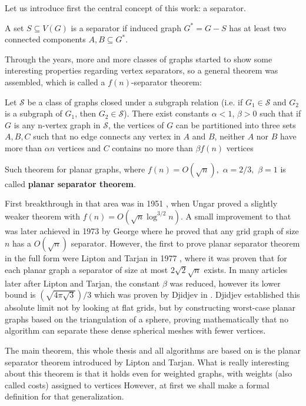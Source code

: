 Let us introduce first the central concept of this work: a separator.
\begin{defn}
    A set $S \subseteq V(G)$ is a separator if induced graph $G^* = G - S$
    has at least two connected components $A,B \subseteq G^*$.
\end{defn}

Through the years, more and more classes of graphs started to show some
interesting properties regarding vertex separators, so a general theorem was
assembled, which is called a $f(n)$-separator theorem:
\begin{theorem} \cite{liptonSeparatorTheoremPlanar1979}  \label{thm:fnseparator}
    Let $\mathcal{S}$ be a class of graphs closed under a subgraph relation (i.e. if
    $G_1 \in \mathcal{S}$ and $G_2$ is a subgraph of $G_1$, then $G_2 \in \mathcal{S}$). There
    exist constants $\alpha < 1$, $\beta > 0$ such that if $G$ is any n-vertex
    graph in $\mathcal{S}$, the vertices of $G$ can be partitioned into three sets $A,B,C$
    such that no edge connects any vertex in $A$ and $B$, neither $A$ nor $B$
    have more than $\alpha n$ vertices and $C$ contains no more than $\beta
    f(n)$ vertices
\end{theorem}

Such theorem for planar graphs, where $f(n) = O(\sqrt{n}),$ $ \alpha = 2/3,
$ $\beta = 1$ is called \textbf{planar separator theorem}.

First breakthrough in that area
was in 1951 \cite{ungar1951theorem}, when Ungar proved a slightly weaker theorem
with $f(n) = O(\sqrt{n} \log^{3/2}n)$. A small improvement to that was later
achieved in 1973 by George \cite{george1973nested} where he proved that any
grid graph of size $n$ has a $O({\sqrt{n}})$ separator. However, the first to
prove planar separator theorem in the full form were Lipton and Tarjan in 1977
\cite{liptonSeparatorTheoremPlanar1979}, where it was proven that for each
planar graph a separator of size at most $2\sqrt{2} \sqrt{n}$ exists.
In many articles later after Lipton and Tarjan, the constant $\beta$ was
reduced, however its lower bound is $(\sqrt{4\pi \sqrt{3}})/3$ which was proven
by Djidjev in \cite{djidjev1982problem}.
Djidjev established this absolute limit not by looking at flat grids,
but by constructing worst-case planar graphs based on the triangulation
of a sphere, proving mathematically that no algorithm can separate
these dense spherical meshes with fewer vertices.

The main theorem, this whole thesis and all algorithms are based
on is the planar separator theorem introduced by Lipton and Tarjan.
What is really interesting about this theorem is that it holds even for 
weighted graphs, with weights (also called costs) assigned to vertices
However, at first we shall make a formal definition for that generalization.

